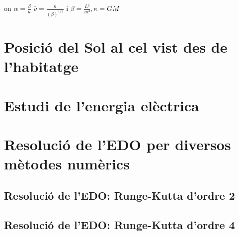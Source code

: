 \documentclass[11pt]{article}
\begin{document}
on $\alpha = \frac{\beta}{\kappa}$ $\bar{v}=\frac{\kappa}{(\beta)^{1/2}}$ i $\beta=\frac{L²}{m²}, \kappa=GM$


\section{Posició del Sol al cel vist des de l'habitatge} 

\section{Estudi de l'energia elèctrica}

\section{Resolució de l'EDO per diversos mètodes numèrics}

\subsection{Resolució de l'EDO: Runge-Kutta d'ordre 2}

\subsection{Resolució de l'EDO: Runge-Kutta d'ordre 4}
\end{document}
